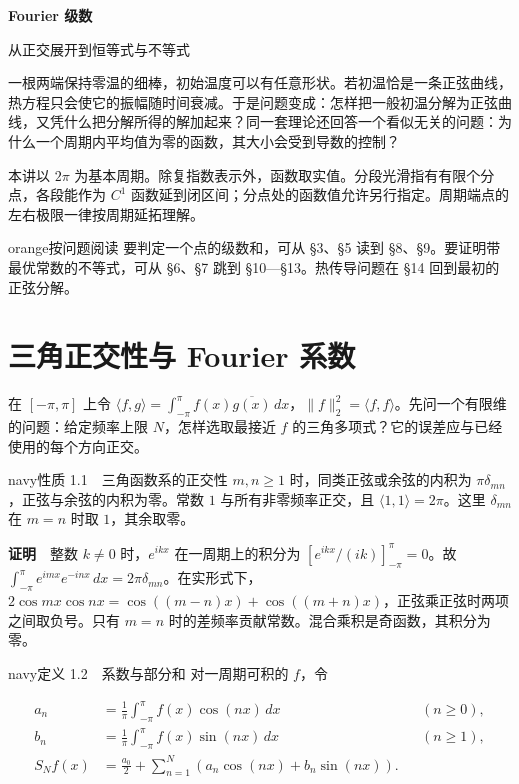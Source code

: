 \documentclass[12pt,a4paper]{article}
\newcommand{\mysection}[1]{\clearpage\section{#1}}
\begin{document}
\begin{center}{\LARGE\bfseries Fourier 级数\par}\vspace{5pt}
{\large 从正交展开到恒等式与不等式\par}\end{center}
一根两端保持零温的细棒，初始温度可以有任意形状。若初温恰是一条正弦曲线，热方程只会使它的振幅随时间衰减。于是问题变成：怎样把一般初温分解为正弦曲线，又凭什么把分解所得的解加起来？同一套理论还回答一个看似无关的问题：为什么一个周期内平均值为零的函数，其大小会受到导数的控制？

本讲以 \(2\pi\) 为基本周期。除复指数表示外，函数取实值。分段光滑指有有限个分点，各段能作为 \(C^1\) 函数延到闭区间；分点处的函数值允许另行指定。周期端点的左右极限一律按周期延拓理解。

\begin{sboxenv}{orange}{按问题阅读}
要判定一个点的级数和，可从 §3、§5 读到 §8、§9。要证明带最优常数的不等式，可从 §6、§7 跳到 §10—§13。热传导问题在 §14 回到最初的正弦分解。
\end{sboxenv}
\begingroup\small\setlength{\parskip}{0pt}\renewcommand{\numberline}[1]{\makebox[2.6em][l]{§#1}}\tableofcontents\endgroup


\mysection{三角正交性与 Fourier 系数}


在 \([-\pi,\pi]\) 上令 \(\langle f,g\rangle=\int_{-\pi}^{\pi}f(x)\overline{g(x)}\,dx\)，\(\|f\|_2^2=\langle f,f\rangle\)。先问一个有限维的问题：给定频率上限 \(N\)，怎样选取最接近 \(f\) 的三角多项式？它的误差应与已经使用的每个方向正交。

\begin{sboxenv}{navy}{性质 1.1　三角函数系的正交性}
\(m,n\ge1\) 时，同类正弦或余弦的内积为 \(\pi\delta_{mn}\)，正弦与余弦的内积为零。常数 \(1\) 与所有非零频率正交，且 \(\langle1,1\rangle=2\pi\)。这里 \(\delta_{mn}\) 在 \(m=n\) 时取 \(1\)，其余取零。
\end{sboxenv}

\textbf{证明}　整数 \(k\ne0\) 时，\(e^{ikx}\) 在一周期上的积分为 \([e^{ikx}/(ik)]_{-\pi}^{\pi}=0\)。故 \(\int_{-\pi}^{\pi}e^{imx}e^{-inx}\,dx=2\pi\delta_{mn}\)。在实形式下，\(2\cos mx\cos nx=\cos((m-n)x)+\cos((m+n)x)\)，正弦乘正弦时两项之间取负号。只有 \(m=n\) 时的差频率贡献常数。混合乘积是奇函数，其积分为零。

\begin{sboxenv}{navy}{定义 1.2　系数与部分和}
对一周期可积的 \(f\)，令

\[
\begin{aligned}
a_n&=\frac1\pi\int_{-\pi}^{\pi} f(x)\cos(nx)\,dx &&(n\ge0),\\
b_n&=\frac1\pi\int_{-\pi}^{\pi} f(x)\sin(nx)\,dx &&(n\ge1),\\
S_N f(x)&=\frac{a_0}{2}+\sum_{n=1}^{N}(a_n\cos(nx)+b_n\sin(nx)).
\end{aligned}
\]
\end{sboxenv}
\end{document}
